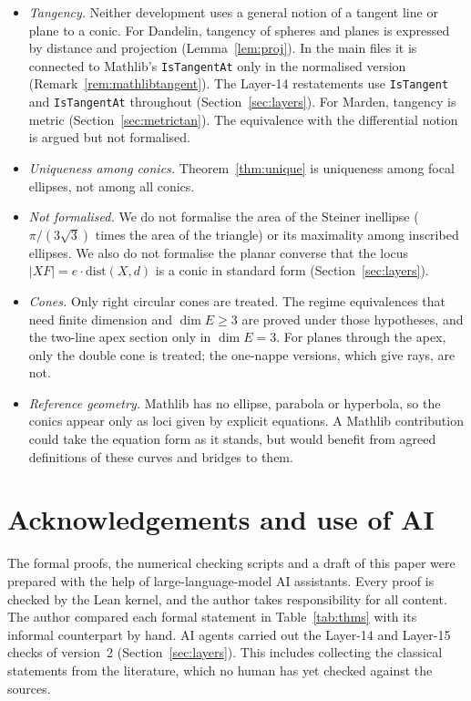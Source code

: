 \documentclass[11pt]{article}
\theoremstyle{remark}
\newcommand{\lean}[1]{\texttt{#1}}
\begin{document}
\begin{itemize}
\item \emph{Tangency.} Neither development uses a general notion of a tangent line or plane to a
conic. For Dandelin, tangency of spheres and planes is expressed by distance and projection
(Lemma~\ref{lem:proj}). In the main files it is connected to Mathlib's \lean{IsTangentAt} only in the
normalised version (Remark~\ref{rem:mathlibtangent}). The Layer-14 restatements use \lean{IsTangent}
and \lean{IsTangentAt} throughout (Section~\ref{sec:layers}). For Marden, tangency is metric
(Section~\ref{sec:metrictan}). The equivalence with the differential notion is argued but not
formalised.
\item \emph{Uniqueness among conics.} Theorem~\ref{thm:unique} is uniqueness among focal
ellipses, not among all conics.
\item \emph{Not formalised.} We do not formalise the area of the Steiner inellipse
($\pi/(3\sqrt3)$ times the area of the triangle) or its maximality among inscribed ellipses.
We also do not formalise the planar converse that the locus $|XF|=e\cdot\mathrm{dist}(X,d)$ is a
conic in standard form (Section~\ref{sec:layers}).
\item \emph{Cones.} Only right circular cones are treated. The regime equivalences that need
finite dimension and $\dim E\ge3$ are proved under those hypotheses, and the two-line apex section only in
$\dim E=3$. For planes through the apex, only the double cone is treated; the one-nappe versions,
which give rays, are not.
\item \emph{Reference geometry.} Mathlib has no ellipse, parabola or hyperbola, so the
conics appear only as loci given by explicit equations. A Mathlib contribution could take the
equation form as it stands, but would benefit from agreed definitions of these curves and bridges
to them.
\end{itemize}

\section*{Acknowledgements and use of AI}
The formal proofs, the numerical checking scripts and a draft of this paper were prepared with the
help of large-language-model AI assistants. Every proof is checked by the Lean kernel, and the
author takes responsibility for all content. The author compared each formal statement in
Table~\ref{tab:thms} with its informal counterpart by hand. AI agents carried out the Layer-14 and
Layer-15 checks of version~2 (Section~\ref{sec:layers}). This includes collecting the classical
statements from the literature, which no human has yet checked against the sources.
\end{document}
